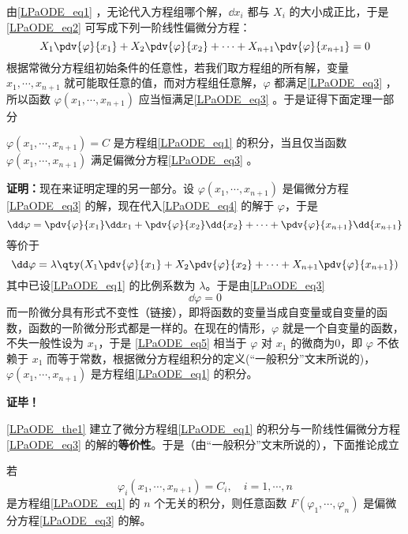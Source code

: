 由\autoref{LPaODE_eq1} ，无论代入方程组哪个解，$\dd x_i$ 都与 $X_i$ 的大小成正比，于是\autoref{LPaODE_eq2} 可写成下列一阶线性偏微分方程：
\begin{equation}\label{LPaODE_eq3}
X_1\pdv{\varphi}{x_1}+X_2\pdv{\varphi}{x_2}+\cdots+X_{n+1}\pdv{\varphi}{x_{n+1}}=0
\end{equation}
根据常微分方程组初始条件的任意性，若我们取方程组的所有解，变量 $x_1,\cdots,x_{n+1}$ 就可能取任意的值，而对方程组任意解，$\varphi$ 都满足\autoref{LPaODE_eq3} ，所以函数 $\varphi(x_1,\cdots,x_{n+1})$ 应当恒满足\autoref{LPaODE_eq3} 。于是证得下面定理一部分
\begin{theorem}{}\label{LPaODE_the1}
 $\varphi(x_1,\cdots,x_{n+1})=C$ 是方程组\autoref{LPaODE_eq1} 的积分，当且仅当函数 $\varphi(x_1,\cdots,x_{n+1})$ 满足偏微分方程\autoref{LPaODE_eq3} 。
\end{theorem}
 \textbf{证明：}现在来证明定理的另一部分。设 $\varphi(x_1,\cdots,x_{n+1})$ 是偏微分方程\autoref{LPaODE_eq3} 的解，现在代入\autoref{LPaODE_eq4} 的解于 $\varphi$，于是
 \begin{equation}
 \dd\varphi=\pdv{\varphi}{x_1}\dd x_1+\pdv{\varphi}{x_2}\dd{x_2}+\cdots+\pdv{\varphi}{x_{n+1}}\dd{x_{n+1}}
 \end{equation}
 等价于
 \begin{equation}
 \dd\varphi=\lambda\qty(X_1\pdv{\varphi}{x_1}+X_2\pdv{\varphi}{x_2}+\cdots+X_{n+1}\pdv{\varphi}{x_{n+1}})
 \end{equation}
 其中已设\autoref{LPaODE_eq1} 的比例系数为 $\lambda$。于是由\autoref{LPaODE_eq3} 
 \begin{equation}\label{LPaODE_eq5}
 \dd\varphi=0
 \end{equation}
 而一阶微分具有形式不变性（链接），即将函数的变量当成自变量或自变量的函数，函数的一阶微分形式都是一样的。在现在的情形，$\varphi$ 就是一个自变量的函数，不失一般性设为 $x_1$，于是 \autoref{LPaODE_eq5} 相当于 $\varphi$ 对 $x_1$ 的微商为0，即 $\varphi$ 不依赖于 $x_1$ 而等于常数，根据微分方程组积分的定义(“一般积分”文末所说的)，$\varphi(x_1,\cdots,x_{n+1})$ 是方程组\autoref{LPaODE_eq1} 的积分。

 \textbf{证毕！}

 \autoref{LPaODE_the1} 建立了微分方程组\autoref{LPaODE_eq1} 的积分与一阶线性偏微分方程\autoref{LPaODE_eq3} 的解的\textbf{等价性}。于是（由“一般积分”文末所说的），下面推论成立
 \begin{corollary}{}
 若
 \begin{equation}
 \varphi_i(x_1,\cdots,x_{n+1})=C_i,\quad i=1,\cdots,n
 \end{equation}
 是方程组\autoref{LPaODE_eq1} 的 $n$ 个无关的积分，则任意函数 $F(\varphi_1,\cdots,\varphi_n)$ 是偏微分方程\autoref{LPaODE_eq3} 的解。
 \end{corollary}
